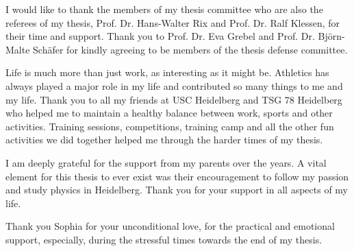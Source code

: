 I would like to thank the members of my thesis committee who are also the referees of my thesis, Prof. Dr. Hans-Walter Rix and Prof. Dr. Ralf Klessen, for their time and support.
Thank you to Prof. Dr. Eva Grebel and Prof. Dr. Bj\"orn-Malte Sch\"afer for kindly agreeing to be members of the thesis defense committee.

\vspace{\baselineskip}

Life is much more than just work, as interesting as it might be. Athletics has always played a major role in my life and contributed so many things to me and my life.
Thank you to all my friends at USC Heidelberg and TSG 78 Heidelberg who helped me to maintain a healthy balance between work, sports and other activities. Training sessions, competitions, training camp and all the other fun activities we did together helped me through the harder times of my thesis.

\vspace{\baselineskip}

I am deeply grateful for the support from my parents over the years. A vital element for this thesis to ever exist was their encouragement to follow my passion and study physics in Heidelberg. Thank you for your support in all aspects of my life.

\vspace{\baselineskip}

Thank you Sophia for your unconditional love, for the practical and emotional support, especially, during the stressful times towards the end of my thesis.


\endgroup


\newpage
\chaptermark{}